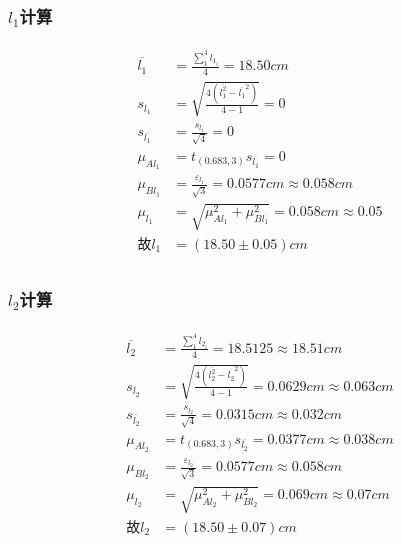 \documentclass[12pt,a4paper,UTF8]{ctexart}
\begin{document}
\subsubsection*{$l_1$计算}
\begin{align*}
        \begin{aligned}
        \overline{l_1}&=\frac{\sum_{1}^{4}l_{1_i}}{4}=18.50cm\\
        s_{l_{1}}&=\sqrt{\frac{4(\overline{l_1^2}-\overline{l_1}^2)}{4-1}}=0\\
		s_{\overline{l_{1}}} &= \frac{s_{l_{1}}}{\sqrt{4}} = 0\\
		\mu_{Al_1} &= t_{(0.683,3)}s_{\overline{l_1}} = 0\\
		\mu_{Bl_1} &= \frac{\varepsilon_{l_1}}{\sqrt{3}} = 0.0577cm \approx 0.058cm\\
		\mu_{l_1} &= \sqrt{\mu_{Al_1}^2+\mu_{Bl_1}^2}=0.058cm\approx 0.05\\
		\text{故}l_1 &= (18.50 \pm 0.05)cm \\
        \end{aligned}
\end{align*}
\subsubsection*{$l_2$计算}
\begin{align*}
        \begin{aligned}
        \overline{l_2}&=\frac{\sum_{1}^{4}l_{2_i}}{4}=18.5125\approx 18.51cm\\
        s_{l_{2}}&=\sqrt{\frac{4(\overline{l_2^2}-\overline{l_2}^2)}{4-1}}=0.0629cm\approx 0.063cm\\
		s_{\overline{l_{2}}} &= \frac{s_{l_{2}}}{\sqrt{4}} = 0.0315cm\approx 0.032cm\\
		\mu_{Al_2} &= t_{(0.683,3)}s_{\overline{l_2}} = 0.0377cm\approx0.038cm\\
		\mu_{Bl_2} &= \frac{\varepsilon_{l_2}}{\sqrt{3}} = 0.0577cm \approx 0.058cm\\
		\mu_{l_2} &= \sqrt{\mu_{Al_2}^2+\mu_{Bl_2}^2}=0.069cm\approx 0.07cm\\
		\text{故}l_2 &= (18.50 \pm 0.07)cm \\
        \end{aligned}
\end{align*}
\end{document}
